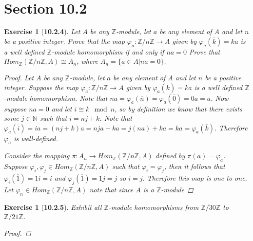 \documentclass[12pt]{amsart}
\newtheorem{exercise}[theorem]{Exercise}
\theoremstyle{remark}
\newcommand{\NN}{{\mathbb N}}
\newcommand{\ZZ}{{\mathbb Z}}
\theoremstyle{mycomment}
\begin{document}
\section*{Section 10.2}



\begin{exercise}[\textbf{10.2.4}] Let $A$ be any $\ZZ$-module, let $a$ be any element of $A$ and let $n$ be a positive integer. 
  Prove that the map $\varphi_a: \ZZ/n\ZZ \to A$ given by $\varphi_a(\overline{k}) = ka$ is a well defined $\ZZ$-module homomorphism if and only if $na = 0$
  Prove that $Hom_\ZZ(\ZZ/n\ZZ, A)\cong A_n$, where $A_n = \{ a \in A |na = 0\}$.    
    \begin{proof} Let $A$ be any $\ZZ$-module, let $a$ be any element of $A$ and let $n$ be a positive integer. Suppose the map  $\varphi_a: \ZZ/n\ZZ \to A$ given by $\varphi_a(\overline{k}) = ka$ is a well defined $\ZZ$-module homomorphism. Note that $na = \varphi_a(\overline{n}) = \varphi_a(\overline{0}) = 0a = a$. Now suppose $na = 0$ and let $i \cong k \mod n$, so by definition we know that there exists some 
      $j \in \NN$ such that $i = nj + k$. Note that $\varphi_a(\overline{i}) = ia = (nj + k)a = nja + ka = j(na) + ka = ka = \varphi_a(\overline{k})$. Therefore $\varphi_a$ is well-defined.





      Consider the mapping $\pi: A_n \to Hom_\ZZ(\ZZ/n\ZZ, A)$ defined by $\pi(a) = \varphi_a$. Suppose $\varphi_i, \varphi_j \in Hom_\ZZ(\ZZ/n\ZZ, A)$ such that $\varphi_i = \varphi_j$, then it follows that 
      $\varphi_i(\overline{1}) = 1i = i$ and $\varphi_j(\overline{1}) = 1j = j$ so $i = j$. Therefore this map is one to one. Let $\varphi_n \in Hom_\ZZ(\ZZ/n\ZZ, A)$ note that since $A$ is a $\ZZ$-module 
    


    
  \end{proof}

\end{exercise}
\vspace{.5in}




\begin{exercise}[\textbf{10.2.5}] Exhibit all $\ZZ$-module homomorphisms from $\ZZ/30\ZZ$ to $\ZZ/21\ZZ$.
  \begin{proof}
    
  \end{proof}

\end{exercise}
\vspace{.5in}
\end{document}
